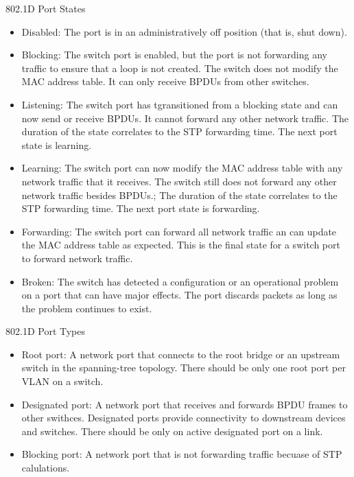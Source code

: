 \documentclass{article}
\begin{document}
802.1D Port States
\begin{itemize}
\item Disabled: The port is in an administratively off position (that is, shut down).
\item Blocking: The switch port is enabled, but the port is not forwarding any traffic to ensure that a loop is not created. The switch does not modify the MAC address table. It can only receive BPDUs from other switches.
\item Listening: The switch port has tgransitioned from a blocking state and can now send or receive BPDUs. It cannot forward any other network traffic. The duration of the state correlates to the STP forwarding time. The next port state is learning.
\item Learning: The switch port can now modify the MAC address table with any network traffic that it receives. The switch still does not forward any other network traffic besides BPDUs.; The duration of the state correlates to the STP forwarding time. The next port state is forwarding.
\item Forwarding: The switch port can forward all network traffic an can update the MAC address table as expected. This is the final state for a switch port to forward network traffic.
\item Broken: The switch has detected a configuration or an operational problem on a port that can have major effects. The port discards packets as long as the problem continues to exist.
\end{itemize}

802.1D Port Types
\begin{itemize}
\item Root port: A network port that connects to the root bridge or an upstream switch in the spanning-tree topology. There should be only one root port per VLAN on a switch.
\item Designated port: A network port that receives and forwards BPDU frames to other swithces. Designated ports provide connectivity to downstream devices and switches. There should be only on active designated port on a link.
\item Blocking port: A network port that is not forwarding traffic becuase of STP calulations.
\end{itemize}
\end{document}
